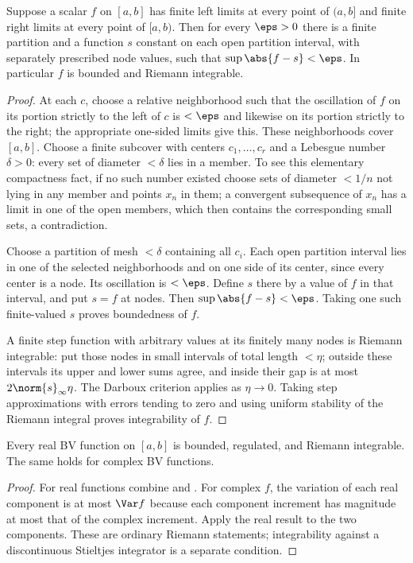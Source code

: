 \begin{theorem}
Suppose a scalar $f$ on $[a,b]$ has finite left limits at every point of $(a,b]$ and finite right limits at every point of $[a,b)$. Then for every $\eps>0$ there is a finite partition and a function $s$ constant on each open partition interval, with separately prescribed node values, such that $\sup\abs{f-s}<\eps$. In particular $f$ is bounded and Riemann integrable.
\end{theorem}
\begin{proof}
At each $c$, choose a relative neighborhood such that the oscillation of $f$ on its portion strictly to the left of $c$ is $<\eps$ and likewise on its portion strictly to the right; the appropriate one-sided limits give this. These neighborhoods cover $[a,b]$. Choose a finite subcover with centers $c_1,\ldots,c_r$ and a Lebesgue number $\delta>0$: every set of diameter $<\delta$ lies in a member. To see this elementary compactness fact, if no such number existed choose sets of diameter $<1/n$ not lying in any member and points $x_n$ in them; a convergent subsequence of $x_n$ has a limit in one of the open members, which then contains the corresponding small sets, a contradiction.

Choose a partition of mesh $<\delta$ containing all $c_i$. Each open partition interval lies in one of the selected neighborhoods and on one side of its center, since every center is a node. Its oscillation is $<\eps$. Define $s$ there by a value of $f$ in that interval, and put $s=f$ at nodes. Then $\sup\abs{f-s}<\eps$. Taking one such finite-valued $s$ proves boundedness of $f$.

A finite step function with arbitrary values at its finitely many nodes is Riemann integrable: put those nodes in small intervals of total length $<\eta$; outside these intervals its upper and lower sums agree, and inside their gap is at most $2\norm{s}_\infty\eta$. The Darboux criterion applies as $\eta\to0$. Taking step approximations with errors tending to zero and using uniform stability of the Riemann integral proves integrability of $f$.
\end{proof}

\begin{theorem}
Every real BV function on $[a,b]$ is bounded, regulated, and Riemann integrable. The same holds for complex BV functions.
\end{theorem}
\begin{proof}
For real functions combine  and . For complex $f$, the variation of each real component is at most $\Var f$ because each component increment has magnitude at most that of the complex increment. Apply the real result to the two components. These are ordinary Riemann statements; integrability against a discontinuous Stieltjes integrator is a separate condition.
\end{proof}

